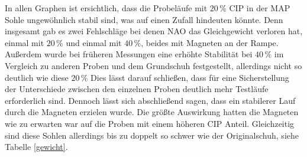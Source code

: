 In allen Graphen ist ersichtlich, dass die Probeläufe mit $20\,\%$ CIP in der MAP Sohle ungewöhnlich stabil sind, was auf einen Zufall hindeuten könnte. Denn insgesamt gab es zwei Fehlschläge bei denen NAO das Gleichgewicht verloren hat, einmal mit $20\,\%$ und einmal mit $40\,\%$, beides mit Magneten an der Rampe. Außerdem wurde bei früheren Messungen eine erhöhte Stabilität bei $40\,\%$ im Vergleich zu anderen Proben und dem Grundschuh festgestellt, allerdings nicht so deutlich wie diese $20\,\%$ Dies lässt darauf schließen, dass für eine Sicherstellung der Unterschiede zwischen den einzelnen Proben deutlich mehr Testläufe erforderlich sind. Dennoch lässt sich abschließend sagen, dass ein stabilerer Lauf durch die Magneten erzielen wurde. Die größte Auswirkung hatten die Magneten wie zu erwarten war auf die Proben mit einem höheren CIP Anteil. Gleichzeitig sind diese Sohlen allerdings bis zu doppelt so schwer wie der Originalschuh, siehe Tabelle \ref{gewicht}. 



%
%
%
%

